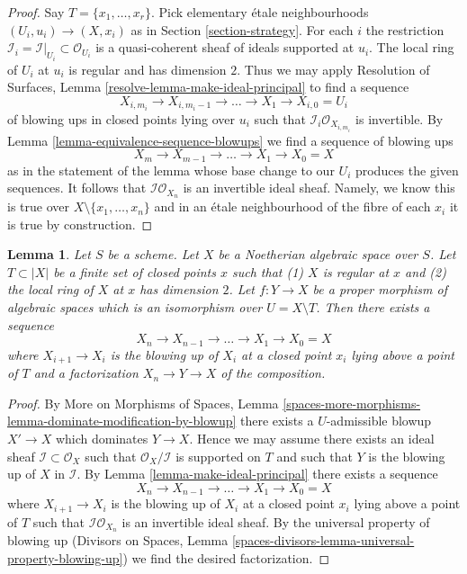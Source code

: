 \documentclass{stacks-project}
\theoremstyle{plain}
\newtheorem{lemma}[subsection]{Lemma}
\theoremstyle{definition}
\theoremstyle{remark}
\numberwithin{equation}{subsection}
\begin{document}
\begin{proof}
Say $T = \{x_1, \ldots, x_r\}$. Pick elementary \'etale neighbourhoods
$(U_i, u_i) \to (X, x_i)$ as in Section \ref{section-strategy}.
For each $i$ the restriction
$\mathcal{I}_i = \mathcal{I}|_{U_i} \subset \mathcal{O}_{U_i}$
is a quasi-coherent sheaf of ideals supported at $u_i$.
The local ring of $U_i$ at $u_i$ is regular and has dimension $2$.
Thus we may apply
Resolution of Surfaces, Lemma \ref{resolve-lemma-make-ideal-principal}
to find a sequence
$$
X_{i, m_i} \to X_{i, m_i - 1} \to \ldots \to X_1 \to X_{i, 0} = U_i
$$
of blowing ups in closed points lying over $u_i$ such that
$\mathcal{I}_i \mathcal{O}_{X_{i, m_i}}$ is invertible.
By Lemma \ref{lemma-equivalence-sequence-blowups}
we find a sequence of blowing ups
$$
X_m \to X_{m - 1} \to \ldots \to X_1 \to X_0 = X
$$
as in the statement of the lemma whose base change to our $U_i$
produces the given sequences. It follows that
$\mathcal{I}\mathcal{O}_{X_n}$ is an invertible ideal sheaf.
Namely, we know this is true over $X \setminus \{x_1, \ldots, x_n\}$
and in an \'etale neighbourhood of the fibre of each $x_i$
it is true by construction.
\end{proof}

\begin{lemma}
\label{lemma-dominate-by-blowing-up-in-points}
Let $S$ be a scheme. Let $X$ be a Noetherian algebraic space over $S$.
Let $T \subset |X|$ be a finite set of closed points $x$ such that
(1) $X$ is regular at $x$ and (2) the local ring of $X$ at $x$ has
dimension $2$. Let $f : Y \to X$ be a proper morphism of
algebraic spaces which is an isomorphism over $U = X \setminus T$.
Then there exists a sequence
$$
X_n \to X_{n - 1} \to \ldots \to X_1 \to X_0 = X
$$
where $X_{i + 1} \to X_i$ is the blowing up of $X_i$ at a closed
point $x_i$ lying above a point of $T$ and a factorization $X_n \to Y \to X$
of the composition.
\end{lemma}

\begin{proof}
By More on Morphisms of Spaces,
Lemma \ref{spaces-more-morphisms-lemma-dominate-modification-by-blowup} 
there exists a $U$-admissible blowup $X' \to X$ which dominates
$Y \to X$. Hence we may assume there exists an ideal sheaf
$\mathcal{I} \subset \mathcal{O}_X$ such that
$\mathcal{O}_X/\mathcal{I}$ is supported on $T$ and such that
$Y$ is the blowing up of $X$ in $\mathcal{I}$.
By Lemma \ref{lemma-make-ideal-principal} 
there exists a sequence
$$
X_n \to X_{n - 1} \to \ldots \to X_1 \to X_0 = X
$$
where $X_{i + 1} \to X_i$ is the blowing up of $X_i$ at a closed
point $x_i$ lying above a point of $T$ such that
$\mathcal{I}\mathcal{O}_{X_n}$ is an invertible ideal sheaf.
By the universal property of blowing up
(Divisors on Spaces, Lemma
\ref{spaces-divisors-lemma-universal-property-blowing-up})
we find the desired factorization.
\end{proof}
\end{document}
